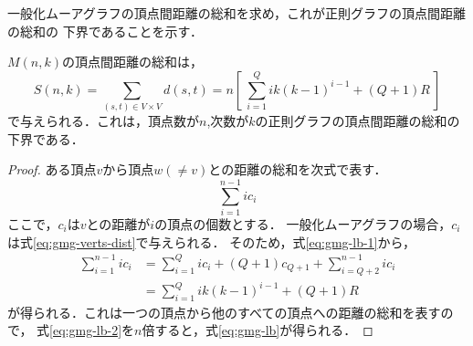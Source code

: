 一般化ムーアグラフの頂点間距離の総和を求め，これが正則グラフの頂点間距離の総和の
下界であることを示す．
\begin{theorem}\rm
  \label{thm:gmg-lower-bound}
  $M(n,k)$の頂点間距離の総和は，
  \begin{equation}
    \label{eq:gmg-lb}
    S(n,k) = \sum_{(s,t)\in V\times V}d(s,t) =
    n \left[\ \sum^{Q}_{i=1}ik(k-1)^{i-1} + (Q+1)R\ \right]
  \end{equation}
  で与えられる．これは，頂点数が$n$,次数が$k$の正則グラフの頂点間距離の総和の下界である．
\end{theorem}
\begin{proof}\rm
  ある頂点$v$から頂点$w(\neq v)$との距離の総和を次式で表す．
  \begin{equation}
    \label{eq:gmg-lb-1}
    \sum_{i=1}^{n-1}i c_i
  \end{equation}
  ここで，$c_i$は$v$との距離が$i$の頂点の個数とする．
  一般化ムーアグラフの場合，$c_i$は式\ref{eq:gmg-verts-dist}で与えられる．
  そのため，式\ref{eq:gmg-lb-1}から，
  \begin{align}
      \sum_{i=1}^{n-1}ic_i
      &=\sum_{i=1}^{Q}ic_i+(Q+1)c_{Q+1}+\sum_{i=Q+2}^{n-1}ic_i \nonumber\\
      &=\sum_{i=1}^{Q}ik(k-1)^{i-1}+(Q+1)R
      \label{eq:gmg-lb-2}
  \end{align}
  が得られる．これは一つの頂点から他のすべての頂点への距離の総和を表すので，
  式\ref{eq:gmg-lb-2}を$n$倍すると，式\ref{eq:gmg-lb}が得られる．


\end{proof}
